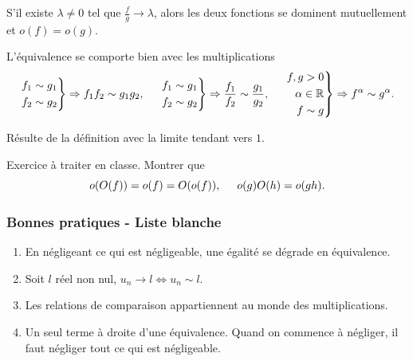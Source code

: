\begin{rem}
  S'il existe $\lambda \neq 0$ tel que $\frac{f}{g} \rightarrow \lambda$, alors les deux fonctions se dominent mutuellement et $o(f) = o(g)$.
\end{rem}
\begin{prop}
 L'équivalence se comporte bien avec les multiplications
\[
 \left. 
 \begin{aligned}
  f_1 &\sim g_1 \\ f_2 &\sim g_2 
 \end{aligned}
 \right\rbrace \Rightarrow f_1 f_2 \sim g_1 g_2, \hspace{0.5cm}
 \left. 
 \begin{aligned}
f_1 &\sim g_1 \\ f_2 &\sim g_2  
 \end{aligned}
 \right\rbrace \Rightarrow \frac{f_1}{f_2} \sim \frac{g_1}{ g_2}, \hspace{0.5cm}
 \left. 
 \begin{aligned}
  f, g > 0 \\ \alpha \in \mathbb{R} \\ f \sim g
 \end{aligned}
\right\rbrace  \Rightarrow f^\alpha \sim g^\alpha .
\]
\end{prop}
\begin{demo}
 Résulte de la définition avec la limite tendant vers $1$.
\end{demo}

Exercice à traiter en classe.\newline
Montrer que
\[
 o(O(f)) = o(f) = O(o(f)),\hspace{0.5cm} o(g)O(h) = o(gh).
\]


\subsubsection{Bonnes pratiques - Liste blanche} 
\begin{enumerate}
  \item En négligeant ce qui est négligeable, une égalité se dégrade en équivalence.
  \item Soit $l$ réel non nul, $u_n \rightarrow l \Leftrightarrow u_n \sim l$.
  \item Les relations de comparaison appartiennent au monde des multiplications.
  \item Un seul terme à droite d'une équivalence. Quand on commence à négliger, il faut négliger tout ce qui est négligeable.
\end{enumerate}

